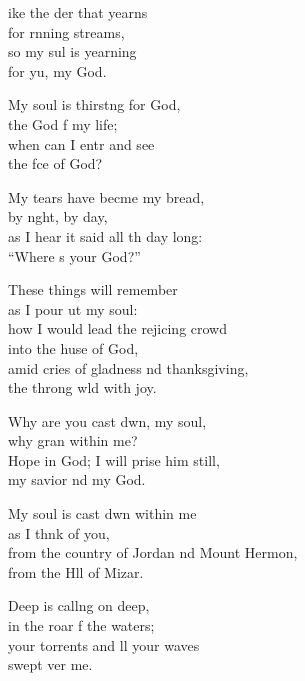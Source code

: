 \settowidth{\versewidth}{from the country of Jordan and Mount Hermon, *}
\begin{psalmverse}%
  \begin{patverse}
ike the der that yearns\Med\\
for rnning streams,\\
so my sul is yearning\Med\\
for yu, my God.

My soul is thirst\pointup{\i}ng for God,\Med\\
the God f my life;\\
when can I entr and see\Med\\
the fce of God?

My tears have becme my bread,\Med\\
by n\pointup{\i}ght, by day,\\
as I hear it said all th day long:\Med\\
“Where \pointup{\i}s your God?”

These things will  remember\Med\\
as I pour ut my soul:\\
how I would lead the rejicing crowd\Med\\
into the huse of God,\\
amid cries of gladness nd thanksgiving,\Med\\
the throng w\pointup{\i}ld with joy.

Why are you cast dwn, my soul,\Med\\
why gran within me?\\
Hope in God; I will prise him still,\Med\\
my savior nd my God.

My soul is cast dwn within me\Med\\
as I th\pointup{\i}nk of you,\\
from the country of Jordan nd Mount Hermon,\Med\\
from the H\pointup{\i}ll of Mizar.

Deep is call\pointup{\i}ng on deep,\Med\\
in the roar f the waters;\\
your torrents and ll your waves\Med\\
swept ver me.


\end{patverse}
\end{psalmverse}
